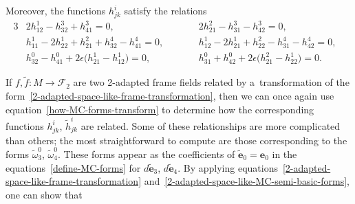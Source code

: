 \documentclass[10pt,a4paper]{amsart}
\numberwithin{equation}{section}
\theoremstyle{definition}
\begin{document}
Moreover, the functions $h^i_{jk}$ satisfy the relations
\begin{alignat}{3}
& 2 h^1_{12} - h^3_{32} + h^3_{41} = 0,
\qquad &&
2 h^2_{21} - h^3_{31} - h^3_{42} = 0,&
\nonumber
\\
& h^1_{11} - 2 h^1_{22} + h^2_{21} + h^4_{32} - h^4_{41} = 0,
\qquad &&
h^1_{12} - 2 h^1_{21} + h^2_{22} - h^4_{31} - h^4_{42} = 0,&
\nonumber
\\
& h^0_{32} - h^0_{41} + 2\epsilon\big(h^1_{21} - h^1_{12}\big) = 0,
\qquad &&
h^0_{31} + h^0_{42} + 2\epsilon\big(h^2_{21} - h^1_{22}\big) = 0.&
\label{2-adapted-space-like-h-relations}
\end{alignat}

If $f, \tilde{f}:M \to \mathcal{F}_2$ are two 2-adapted frame f\/ields related by a~transformation of the
form~\eqref{2-adapted-space-like-frame-transformation}, then we can once again use
equation~\eqref{how-MC-forms-transform} to determine how the corresponding functions $h^i_{jk}$, $\tilde{h}^i_{jk}$ are
related.
Some of these relationships are more complicated than others; the most straightforward to compute are those
corresponding to the forms $\tilde{\omega}^0_3$, $\tilde{\omega}^0_4$.
These forms appear as the coef\/f\/icients of $\tilde{\mathbf{e}}_0 = \mathbf{e}_0$ in the equations~\eqref{define-MC-forms}
for $d\tilde{\mathbf{e}}_3$, $d\tilde{\mathbf{e}}_4$.
By applying equations~\eqref{2-adapted-space-like-frame-transformation}
and~\eqref{2-adapted-space-like-MC-semi-basic-forms}, one can show that
\end{document}
